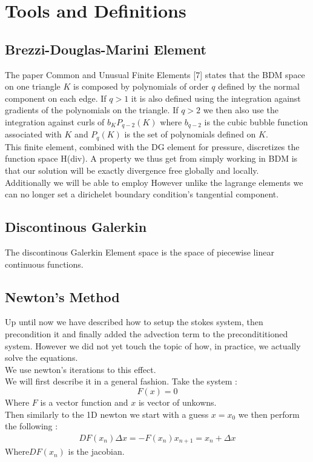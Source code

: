 \documentclass[11pt,twoside,a4paper]{article}
\begin{document}
\section{Tools and Definitions}
\subsection{Brezzi-Douglas-Marini Element}
The paper Common and Unusual Finite Elements [7] states that the BDM space on one triangle $K$ is composed by polynomials of order $q$ defined by the normal component on each edge. If $q > 1$ it is also defined using the integration against gradients of the polynomials on the triangle. If $q > 2$ we then also use the integration  against curls of $b_K P_{q-2}(K)$ where $b_{q-2}$ is the  cubic bubble function associated with $K$ and $P_{q}(K)$ is the set of polynomials defined on $K$.\\
This finite element, combined with the DG element for pressure, discretizes the function space H(div). A property we thus get from simply working in BDM is that our solution will be exactly divergence free globally and locally. \\
Additionally we will be able to employ
However unlike the lagrange elements we can no longer set a dirichelet boundary condition's tangential component.


\subsection{Discontinous Galerkin}
The discontinous Galerkin Element space is the space of piecewise linear continuous functions.

\subsection{Newton's Method}
Up until now we have described how to setup the stokes system, then precondition it and finally added the advection term to the precondititioned system. However we did not yet touch the topic of how, in practice, we actually solve the equations.\\
We use newton's iterations to this effect.\\
We will first describe it in a general fashion. Take the system :
$$
F(x) = 0
$$
Where $F$ is a vector function and $x$ is vector of unkowns.\\
Then similarly to the 1D newton we start with a guess $x = x_0$ we then perform the following :
\begin{align}
DF(x_n) \Delta x = - F(x_n)
x_{n+1} = x_n + \Delta x 
\end{align}
Where$DF(x_n)$ is the jacobian.
\end{document}
